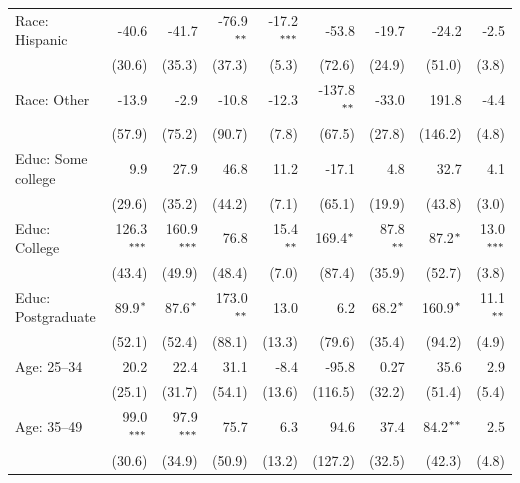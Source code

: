 \documentclass[12pt, letterpaper]{article}
\begin{document}
\begin{table}[!ht]
\begin{adjustbox}{max width=\textwidth}
\begin{tabular}{@{\hspace{0\tabcolsep}}l*{8}{D{.}{.}{-1}}@{\hspace{0\tabcolsep}}}
      Race: Hispanic          & -40.6         & -41.7         & -76.9$\sym{**}$  & -17.2$\sym{***}$ & -53.8         & -19.7         & -24.2         & -2.5\\   
                              & (30.6)        & (35.3)        & (37.3)        & (5.3)         & (72.6)        & (24.9)        & (51.0)        & (3.8)\\   
      Race: Other             & -13.9         & -2.9          & -10.8         & -12.3         & -137.8$\sym{**}$ & -33.0         & 191.8         & -4.4\\   
                              & (57.9)        & (75.2)        & (90.7)        & (7.8)         & (67.5)        & (27.8)        & (146.2)       & (4.8)\\   
      Educ: Some college      & 9.9           & 27.9          & 46.8          & 11.2          & -17.1         & 4.8           & 32.7          & 4.1\\   
                              & (29.6)        & (35.2)        & (44.2)        & (7.1)         & (65.1)        & (19.9)        & (43.8)        & (3.0)\\   
      Educ: College           & 126.3$\sym{***}$ & 160.9$\sym{***}$ & 76.8          & 15.4$\sym{**}$   & 169.4$\sym{*}$   & 87.8$\sym{**}$   & 87.2$\sym{*}$    & 13.0$\sym{***}$\\   
                              & (43.4)        & (49.9)        & (48.4)        & (7.0)         & (87.4)        & (35.9)        & (52.7)        & (3.8)\\   
      Educ: Postgraduate      & 89.9$\sym{*}$    & 87.6$\sym{*}$    & 173.0$\sym{**}$  & 13.0          & 6.2           & 68.2$\sym{*}$    & 160.9$\sym{*}$   & 11.1$\sym{**}$\\   
                              & (52.1)        & (52.4)        & (88.1)        & (13.3)        & (79.6)        & (35.4)        & (94.2)        & (4.9)\\   
      Age: 25--34             & 20.2          & 22.4          & 31.1          & -8.4          & -95.8         & 0.27          & 35.6          & 2.9\\   
                              & (25.1)        & (31.7)        & (54.1)        & (13.6)        & (116.5)       & (32.2)        & (51.4)        & (5.4)\\   
      Age: 35--49             & 99.0$\sym{***}$  & 97.9$\sym{***}$  & 75.7          & 6.3           & 94.6          & 37.4          & 84.2$\sym{**}$   & 2.5\\   
                              & (30.6)        & (34.9)        & (50.9)        & (13.2)        & (127.2)       & (32.5)        & (42.3)        & (4.8)\\   

\end{tabular}
\end{adjustbox}
\end{table}
\end{document}
